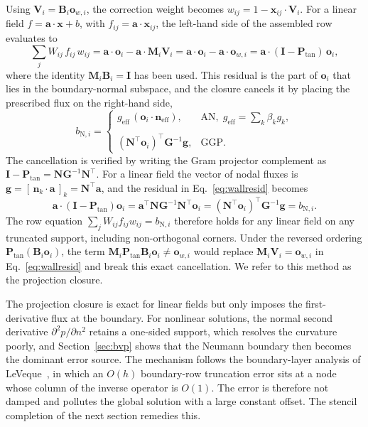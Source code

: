 \documentclass[preprint,review,12pt]{elsarticle}
\newcommand{\xij}{\mathbf{x}_{ij}}
\newcommand{\Mi}{\mathbf{M}_i}
\newcommand{\Bi}{\mathbf{B}_i}
\newcommand{\oi}{\mathbf{o}_i}
\newcommand{\ow}{\mathbf{o}_{w,i}}
\newcommand{\Vi}{\mathbf{V}_i}
\newcommand{\Ptan}{\mathbf{P}_{\mathrm{tan}}}
\begin{document}
Using $\Vi=\Bi\ow$, the correction weight becomes $w_{ij}=1-\xij\cdot\Vi$.
For a linear field $f=\mathbf a\cdot\mathbf x+b$, with $f_{ij}=\mathbf a\cdot\xij$, the left-hand side of the assembled row evaluates to
\begin{equation}
  \sum_j W_{ij}\,f_{ij}\,w_{ij}
  =\mathbf a\cdot\oi-\mathbf a\cdot\Mi\Vi
  =\mathbf a\cdot\oi-\mathbf a\cdot\ow
  =\mathbf a\cdot(\mathbf I-\Ptan)\,\oi,
  \label{eq:wallresid}
\end{equation}
where the identity $\Mi\Bi=\mathbf I$ has been used.
This residual is the part of $\oi$ that lies in the boundary-normal subspace, and the closure cancels it by placing the prescribed flux on the right-hand side,
\begin{equation}
  b_{\mathrm{N},i}=
  \begin{cases}
    g_{\mathrm{eff}}\,(\oi\cdot\mathbf n_{\mathrm{eff}}), & \text{AN},\;g_{\mathrm{eff}}=\textstyle\sum_k\beta_k g_k,\\\\[2pt]
    (\mathbf N^\top\oi)^\top\mathbf G^{-1}\mathbf g, & \text{GGP}.
  \end{cases}
  \label{eq:bwall}
\end{equation}
The cancellation is verified by writing the Gram projector complement as $\mathbf I-\Ptan=\mathbf N\mathbf G^{-1}\mathbf N^\top$.
For a linear field the vector of nodal fluxes is $\mathbf g=[\,\mathbf n_k\cdot\mathbf a\,]_k=\mathbf N^\top\mathbf a$, and the residual in Eq.~\eqref{eq:wallresid} becomes
\begin{equation}
  \mathbf a\cdot(\mathbf I-\Ptan)\oi
  =\mathbf a^\top\mathbf N\mathbf G^{-1}\mathbf N^\top\oi
  =(\mathbf N^\top\oi)^\top\mathbf G^{-1}\mathbf g
  =b_{\mathrm{N},i}.
\end{equation}
The row equation $\sum_j W_{ij}f_{ij}w_{ij}=b_{\mathrm{N},i}$ therefore holds for any linear field on any truncated support, including non-orthogonal corners.
Under the reversed ordering $\Ptan(\Bi\oi)$, the term $\Mi\Ptan\Bi\oi\neq\ow$ would replace $\Mi\Vi=\ow$ in Eq.~\eqref{eq:wallresid} and break this exact cancellation.
We refer to this method as the projection closure.

The projection closure is exact for linear fields but only imposes the first-derivative flux at the boundary.
For nonlinear solutions, the normal second derivative $\partial^2 p/\partial n^2$ retains a one-sided support, which resolves the curvature poorly, and Section~\ref{sec:bvp} shows that the Neumann boundary then becomes the dominant error source.
The mechanism follows the boundary-layer analysis of LeVeque~\cite[\S2.12]{LeVeque2007}, in which an $O(h)$ boundary-row truncation error sits at a node whose column of the inverse operator is $O(1)$.
The error is therefore not damped and pollutes the global solution with a large constant offset.
The stencil completion of the next section remedies this.
\end{document}
